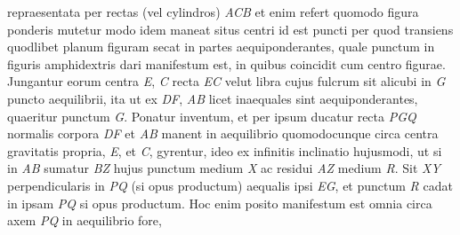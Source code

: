 repraesentata per rectas (vel cylindros) \textit{ACB} et
enim refert quomodo figura ponderis mutetur modo idem maneat situs centri 
id est puncti per quod transiens quodlibet planum figuram secat
in partes aequiponderantes, quale punctum in figuris amphidextris 
dari manifestum est, in quibus coincidit cum centro figurae. 
Jungantur eorum centra \textit{E}, \textit{C} recta \textit{EC} velut libra cujus fulcrum sit alicubi in \textit{G} puncto aequilibrii, ita ut ex 
\textit{DF}, \textit{AB} licet inaequales sint aequiponderantes, 
quaeritur punctum \textit{G}. Ponatur inventum, et per ipsum ducatur recta \textit{PGQ} normalis 
corpora \textit{DF} et \textit{AB} manent in aequilibrio 
quomodocunque circa centra gravitatis propria, \textit{E}, et \textit{C}, gyrentur, ideo ex infinitis 
inclinatio hujusmodi, ut si in \textit{AB} sumatur \textit{BZ} 
hujus punctum medium \textit{X} ac residui \textit{AZ} medium \textit{R}. Sit \textit{XY} perpendicularis in \textit{PQ} (si opus productum) aequalis ipsi \textit{EG}, et punctum \textit{R} cadat in ipsam \textit{PQ} si opus productum. Hoc enim posito manifestum est omnia circa axem \textit{PQ} in aequilibrio fore, 
